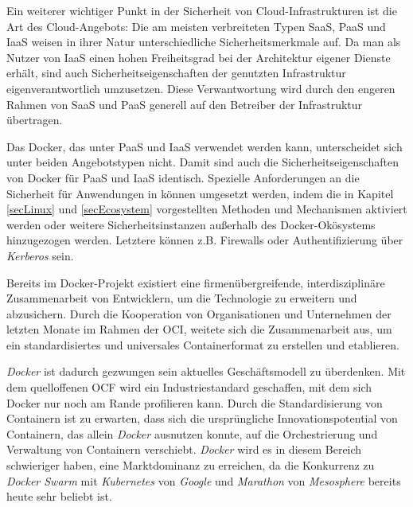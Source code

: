 \documentclass[../main.tex]{subfiles}
\begin{document}
  Ein weiterer wichtiger Punkt in der Sicherheit von Cloud-Infrastrukturen ist die Art des Cloud-Angebots: Die am meisten verbreiteten Typen SaaS, PaaS und IaaS weisen in ihrer Natur unterschiedliche Sicherheitsmerkmale auf. Da man als Nutzer von IaaS einen hohen Freiheitsgrad bei der Architektur eigener Dienste erhält, sind auch Sicherheitseigenschaften der genutzten Infrastruktur eigenverantwortlich umzusetzen. Diese Verwantwortung wird durch den engeren Rahmen von SaaS und PaaS generell auf den Betreiber der Infrastruktur übertragen.

  Das Docker, das unter PaaS und IaaS verwendet werden kann, unterscheidet sich unter beiden Angebotstypen nicht. Damit sind auch die Sicherheitseigenschaften von Docker für PaaS und IaaS identisch. Spezielle Anforderungen an die Sicherheit für Anwendungen in können umgesetzt werden, indem die in Kapitel \ref{secLinux} und \ref{secEcosystem} vorgestellten Methoden und Mechanismen aktiviert werden oder weitere Sicherheitsinstanzen außerhalb des Docker-Okösystems hinzugezogen werden. Letztere können z.B. Firewalls oder Authentifizierung über \emph{Kerberos} sein.





  Bereits im Docker-Projekt existiert eine firmenübergreifende, interdisziplinäre Zusammenarbeit von Entwicklern, um die Technologie zu erweitern und abzusichern. Durch die Kooperation von Organisationen und Unternehmen der letzten Monate im Rahmen der OCI, weitete sich die Zusammenarbeit aus, um ein standardisiertes und universales Containerformat zu erstellen und etablieren.

  \emph{Docker} ist dadurch gezwungen sein aktuelles Geschäftsmodell zu überdenken. Mit dem quelloffenen OCF wird ein Industriestandard geschaffen, mit dem sich Docker nur noch am Rande profilieren kann. Durch die Standardisierung von Containern ist zu erwarten, dass sich die ursprüngliche Innovationspotential von Containern, das allein \emph{Docker} ausnutzen konnte, auf die Orchestrierung und Verwaltung von Containern verschiebt. \emph{Docker} wird es in diesem Bereich schwieriger haben, eine Marktdominanz zu erreichen, da die Konkurrenz zu \emph{Docker Swarm} mit \emph{Kubernetes} von \emph{Google} und \emph{Marathon} von \emph{Mesosphere} bereits heute sehr beliebt ist.
\end{document}
